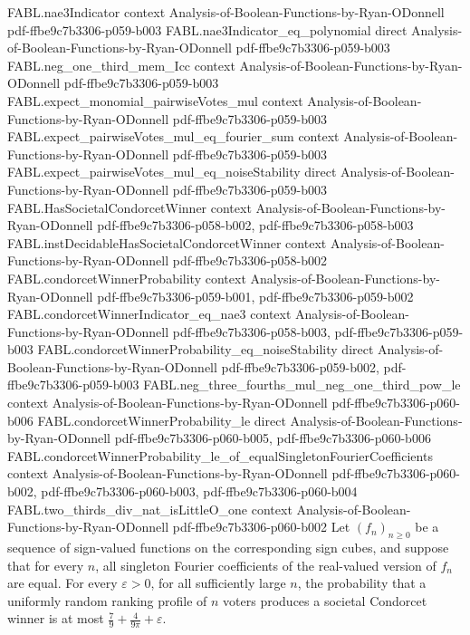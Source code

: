 \begin{theorem}
  {FABL.nae3Indicator}
  {context}
  {Analysis-of-Boolean-Functions-by-Ryan-ODonnell}
  {pdf-ffbe9c7b3306-p059-b003}
\proofstep
  {FABL.nae3Indicator_eq_polynomial}
  {direct}
  {Analysis-of-Boolean-Functions-by-Ryan-ODonnell}
  {pdf-ffbe9c7b3306-p059-b003}
\proofstep
  {FABL.neg_one_third_mem_Icc}
  {context}
  {Analysis-of-Boolean-Functions-by-Ryan-ODonnell}
  {pdf-ffbe9c7b3306-p059-b003}
\proofstep
  {FABL.expect_monomial_pairwiseVotes_mul}
  {context}
  {Analysis-of-Boolean-Functions-by-Ryan-ODonnell}
  {pdf-ffbe9c7b3306-p059-b003}
\proofstep
  {FABL.expect_pairwiseVotes_mul_eq_fourier_sum}
  {context}
  {Analysis-of-Boolean-Functions-by-Ryan-ODonnell}
  {pdf-ffbe9c7b3306-p059-b003}
\proofstep
  {FABL.expect_pairwiseVotes_mul_eq_noiseStability}
  {direct}
  {Analysis-of-Boolean-Functions-by-Ryan-ODonnell}
  {pdf-ffbe9c7b3306-p059-b003}
\proofstep
  {FABL.HasSocietalCondorcetWinner}
  {context}
  {Analysis-of-Boolean-Functions-by-Ryan-ODonnell}
  {pdf-ffbe9c7b3306-p058-b002,
    pdf-ffbe9c7b3306-p058-b003}
\proofstep
  {FABL.instDecidableHasSocietalCondorcetWinner}
  {context}
  {Analysis-of-Boolean-Functions-by-Ryan-ODonnell}
  {pdf-ffbe9c7b3306-p058-b002}
\proofstep
  {FABL.condorcetWinnerProbability}
  {context}
  {Analysis-of-Boolean-Functions-by-Ryan-ODonnell}
  {pdf-ffbe9c7b3306-p059-b001,
    pdf-ffbe9c7b3306-p059-b002}
\proofstep
  {FABL.condorcetWinnerIndicator_eq_nae3}
  {context}
  {Analysis-of-Boolean-Functions-by-Ryan-ODonnell}
  {pdf-ffbe9c7b3306-p058-b003,
    pdf-ffbe9c7b3306-p059-b003}
\proofstep
  {FABL.condorcetWinnerProbability_eq_noiseStability}
  {direct}
  {Analysis-of-Boolean-Functions-by-Ryan-ODonnell}
  {pdf-ffbe9c7b3306-p059-b002,
    pdf-ffbe9c7b3306-p059-b003}
\proofstep
  {FABL.neg_three_fourths_mul_neg_one_third_pow_le}
  {context}
  {Analysis-of-Boolean-Functions-by-Ryan-ODonnell}
  {pdf-ffbe9c7b3306-p060-b006}
\proofstep
  {FABL.condorcetWinnerProbability_le}
  {direct}
  {Analysis-of-Boolean-Functions-by-Ryan-ODonnell}
  {pdf-ffbe9c7b3306-p060-b005,
    pdf-ffbe9c7b3306-p060-b006}
\proofstep
  {FABL.condorcetWinnerProbability_le_of_equalSingletonFourierCoefficients}
  {context}
  {Analysis-of-Boolean-Functions-by-Ryan-ODonnell}
  {pdf-ffbe9c7b3306-p060-b002,
    pdf-ffbe9c7b3306-p060-b003,
    pdf-ffbe9c7b3306-p060-b004}
\proofstep
  {FABL.two_thirds_div_nat_isLittleO_one}
  {context}
  {Analysis-of-Boolean-Functions-by-Ryan-ODonnell}
  {pdf-ffbe9c7b3306-p060-b002}
Let $(f_n)_{n\ge 0}$ be a sequence of sign-valued functions on the corresponding sign
cubes, and suppose that for every $n$, all singleton Fourier coefficients of the
real-valued version of $f_n$ are equal. For every $\varepsilon>0$, for all sufficiently
large $n$, the probability that a uniformly random ranking profile of $n$ voters
produces a societal Condorcet winner is at most $\frac79+\frac{4}{9\pi}+\varepsilon$.
\end{theorem}
